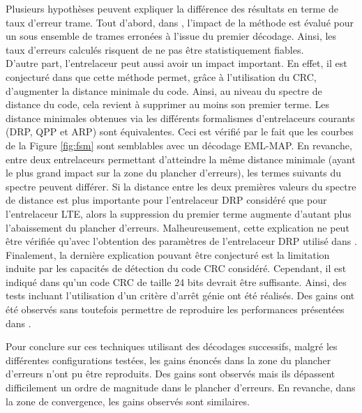 Plusieurs hypothèses peuvent expliquer la différence des résultats en terme de taux d'erreur trame. Tout 
d'abord,  dans \cite{cim}, l'impact de la méthode est évalué pour un sous ensemble de trames erronées à l'issue du premier 
décodage. Ainsi, les taux d'erreurs calculés risquent de ne pas être statistiquement fiables. \\
D'autre part, l'entrelaceur peut aussi avoir un impact important.
En effet, il est conjecturé dans \cite{fsm} que cette méthode permet, grâce à l'utilisation du CRC, d'augmenter la distance
minimale du code. Ainsi, au niveau du spectre de distance du code, cela revient à supprimer au moins son premier terme.
Les distance minimales obtenues via les différents formalismes d'entrelaceurs courants (DRP, QPP et ARP) sont équivalentes. 
Ceci est vérifié par le fait que les courbes de la Figure \ref{fig:fsm} sont semblables avec un décodage 
EML-MAP. En revanche, entre deux entrelaceurs permettant d'atteindre la même distance minimale (ayant le plus grand impact
sur la zone du plancher d'erreurs), les termes suivants du spectre peuvent différer. Si la distance entre les deux 
premières valeurs du spectre de distance est plus importante pour l'entrelaceur DRP considéré que pour l'entrelaceur LTE, alors la 
suppression du premier terme augmente d'autant plus l'abaissement du plancher d'erreurs. Malheureusement, cette explication ne 
peut être vérifiée qu'avec l'obtention des paramètres de l'entrelaceur DRP utilisé dans \cite{cim}.\\
Finalement, la dernière explication pouvant être conjecturé est la limitation induite par les capacités de détection du
code CRC considéré. Cependant, il est indiqué dans \cite{fsm} qu'un code CRC de taille 24 bits devrait être suffisante. Ainsi, 
des tests incluant l'utilisation d'un critère d'arrêt génie ont été réalisés. Des gains ont été observés sans toutefois 
permettre de reproduire les performances présentées dans \cite{cim}.

Pour conclure sur ces techniques utilisant des décodages successifs, malgré les différentes configurations testées, les 
gains énoncés dans la zone du plancher d'erreurs n'ont pu être reproduits. Des gains sont observés mais ils 
dépassent difficilement un ordre de magnitude dans le plancher d'erreurs. En revanche, dans la zone de convergence, les gains 
observés sont similaires. 

